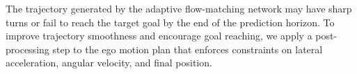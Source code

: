 \documentclass[conference]{IEEEtran}
\begin{document}




The trajectory generated by the adaptive flow-matching network may have sharp turns or fail to reach the target goal by the end of the prediction horizon. To improve trajectory smoothness and encourage goal reaching, we apply a post-processing step to the ego motion plan that enforces constraints on lateral acceleration, angular velocity, and final position.
\end{document}
